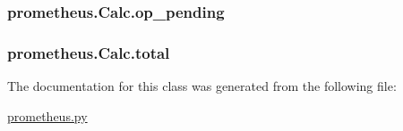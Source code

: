 \subsubsection[{op\+\_\+pending}]{\setlength{\rightskip}{0pt plus 5cm}prometheus.\+Calc.\+op\+\_\+pending}\label{classprometheus_1_1_calc_a4418a12226daea13b6ed01e5b1b87c37}
\hypertarget{classprometheus_1_1_calc_a2adf3713d05b45af5e006fb75ffa76a3}{}
\subsubsection[{total}]{\setlength{\rightskip}{0pt plus 5cm}prometheus.\+Calc.\+total}\label{classprometheus_1_1_calc_a2adf3713d05b45af5e006fb75ffa76a3}


The documentation for this class was generated from the following file\+:\begin{DoxyCompactItemize}
\item 
\hyperlink{prometheus_8py}{prometheus.\+py}\end{DoxyCompactItemize}
